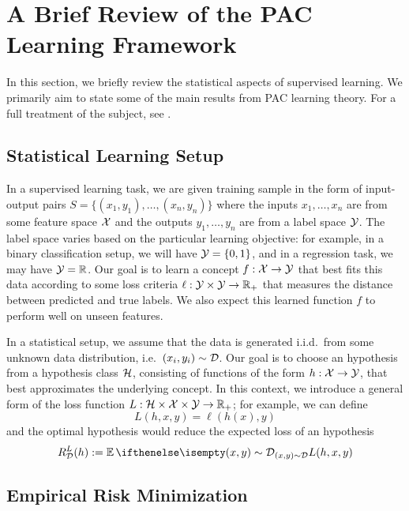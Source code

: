 \section{A Brief Review of the PAC Learning Framework}

In this section, we briefly review the statistical aspects of supervised
learning. We primarily aim to state some of the main results from PAC learning
theory. For a full treatment of the subject, see \cite{shalev2014understanding}.

\subsection{Statistical Learning Setup}

In a supervised learning task, we are given training sample in the form of
input-output pairs $S = \{(x_1, y_1), \ldots, (x_n, y_n)\}$ where the inputs
$x_1, \ldots, x_n$ are from some feature space $\mathcal{X}$ and the outputs $y_1,
\ldots, y_n$ are from a label space $\mathcal{Y}$. The label space varies based on the
particular learning objective: for example, in a binary classification setup, we
will have $\mathcal{Y} = \{0, 1\}$, and in a regression task, we may have $\mathcal{Y} = \mathbb{R}$.
Our goal is to learn a concept $f : \mathcal{X} \to \mathcal{Y}$ that best fits this data
according to some loss criteria $\ell : \mathcal{Y} \times \mathcal{Y} \to \mathbb{R}_+$ that measures
the distance between predicted and true labels. We also expect this learned
function $f$ to perform well on unseen features.

In a statistical setup, we assume that the data is generated i.i.d.\ from some
unknown data distribution, i.e.\ $(x_i, y_i) \sim \mathcal{D}$. Our goal is to choose an
hypothesis from a hypothesis class $\mathcal{H}$, consisting of functions of the form $h
: \mathcal{X} \to \mathcal{Y}$, that best approximates the underlying concept. In this context,
we introduce a general form of the loss function $L : \mathcal{H} \times \mathcal{X} \times \mathcal{Y}
\to \mathbb{R}_+$; for example, we can define
\begin{equation}
  L(h, x, y) = \ell(h(x), y)
\end{equation}
and the optimal hypothesis would reduce the expected loss of an hypothesis
\begin{equation}
  \label{eq:true-risk}
  R_\CD^L(h) := \Ev[(x, y) \sim \CD]{L(h, x, y)}
\end{equation}

\subsection{Empirical Risk Minimization}

